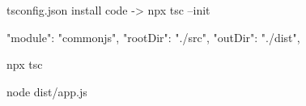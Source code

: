 tsconfig.json install code -> npx tsc --init

  "module": "commonjs", 
      "rootDir": "./src",
    "outDir": "./dist",

npx tsc 

node dist/app.js 

